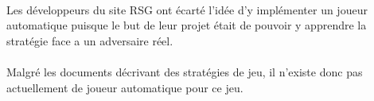 	\paragraph{}
	Les développeurs du site RSG ont écarté l'idée d'y implémenter un joueur automatique puisque le but de leur projet était de 
	pouvoir y apprendre la stratégie face a un adversaire réel.
	
	\paragraph{}
	Malgré les documents décrivant des stratégies de jeu, il n'existe donc pas actuellement de joueur automatique pour ce jeu.
	
	\clearpage